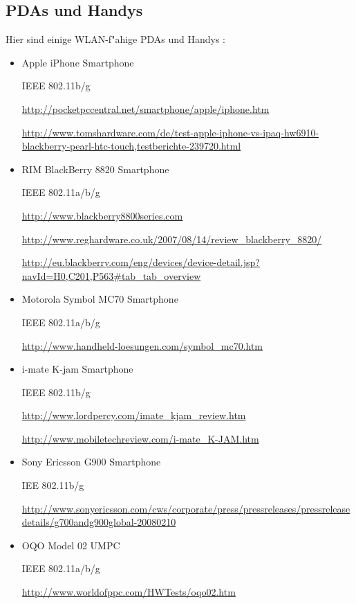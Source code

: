 \subsection{PDAs und Handys}

Hier sind einige WLAN-f"ahige PDAs und Handys :

\begin{itemize}	

\item Apple iPhone Smartphone

IEEE 802.11b/g

\url{http://pocketpccentral.net/smartphone/apple/iphone.htm}

\url{http://www.tomshardware.com/de/test-apple-iphone-vs-ipaq-hw6910-blackberry-pearl-htc-touch,testberichte-239720.html}

\item RIM BlackBerry 8820 Smartphone

IEEE 802.11a/b/g

\url{http://www.blackberry8800series.com}

\url{http://www.reghardware.co.uk/2007/08/14/review\_blackberry\_8820/}

\url{http://eu.blackberry.com/eng/devices/device-detail.jsp?navId=H0,C201,P563#tab\_tab\_overview}

\item Motorola Symbol MC70 Smartphone

IEEE 802.11a/b/g

\url{http://www.handheld-loesungen.com/symbol\_mc70.htm}

\item i-mate K-jam Smartphone

IEEE 802.11b/g

\url{http://www.lordpercy.com/imate\_kjam\_review.htm}

\url{http://www.mobiletechreview.com/i-mate\_K-JAM.htm}

\item Sony Ericsson G900 Smartphone

IEE 802.11b/g

\url{http://www.sonyericsson.com/cws/corporate/press/pressreleases/pressreleasedetails/g700andg900global-20080210}

\item OQO Model 02 UMPC

IEEE 802.11a/b/g

\url{http://www.worldofppc.com/HWTests/oqo02.htm}

\end{itemize}
